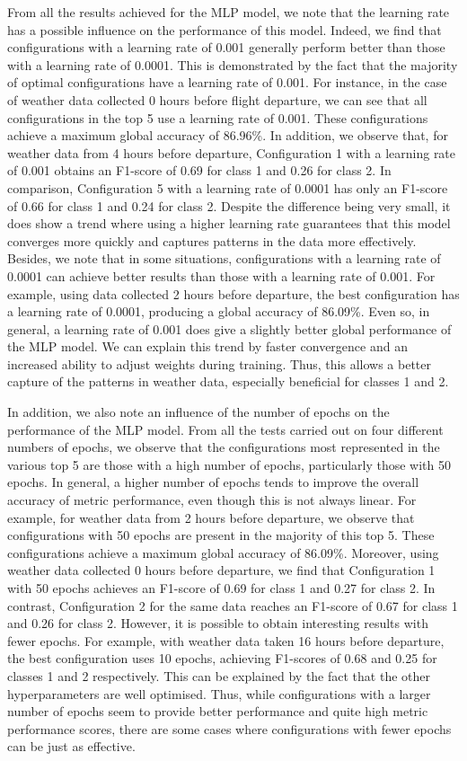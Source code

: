 \documentclass[12pt,oneside]{book} %
\begin{document}
\noindent From all the results achieved for the MLP model, we note that the learning rate has a possible influence on the performance of this model. Indeed, we find that configurations with a learning rate of 0.001 generally perform better than those with a learning rate of 0.0001. This is demonstrated by the fact that the majority of optimal configurations have a learning rate of 0.001. For instance, in the case of weather data collected 0 hours before flight departure, we can see that all configurations in the top 5 use a learning rate of 0.001. These configurations achieve a maximum global accuracy of 86.96\%. In addition, we observe that, for weather data from 4 hours before departure, Configuration 1 with a learning rate of 0.001 obtains an F1-score of 0.69 for class 1 and 0.26 for class 2. In comparison, Configuration 5 with a learning rate of 0.0001 has only an F1-score of 0.66 for class 1 and 0.24 for class 2. Despite the difference being very small, it does show a trend where using a higher learning rate guarantees that this model converges more quickly and captures patterns in the data more effectively. Besides, we note that in some situations, configurations with a learning rate of 0.0001 can achieve better results than those with a learning rate of 0.001. For example, using data collected 2 hours before departure, the best configuration has a learning rate of 0.0001, producing a global accuracy of 86.09\%. Even so, in general, a learning rate of 0.001 does give a slightly better global performance of the MLP model. We can explain this trend by faster convergence and an increased ability to adjust weights during training. Thus, this allows a better capture of the patterns in weather data, especially beneficial for classes 1 and 2.

\noindent In addition, we also note an influence of the number of epochs on the performance of the MLP model. From all the tests carried out on four different numbers of epochs, we observe that the configurations most represented in the various top 5 are those with a high number of epochs, particularly those with 50 epochs. In general, a higher number of epochs tends to improve the overall accuracy of metric performance, even though this is not always linear. For example, for weather data from 2 hours before departure, we observe that configurations with 50 epochs are present in the majority of this top 5. These configurations achieve a maximum global accuracy of 86.09\%. Moreover, using weather data collected 0 hours before departure, we find that Configuration 1 with 50 epochs achieves an F1-score of 0.69 for class 1 and 0.27 for class 2. In contrast, Configuration 2 for the same data reaches an F1-score of 0.67 for class 1 and 0.26 for class 2. However, it is possible to obtain interesting results with fewer epochs. For example, with weather data taken 16 hours before departure, the best configuration uses 10 epochs, achieving F1-scores of 0.68 and 0.25 for classes 1 and 2 respectively. This can be explained by the fact that the other hyperparameters are well optimised. Thus, while configurations with a larger number of epochs seem to provide better performance and quite high metric performance scores, there are some cases where configurations with fewer epochs can be just as effective.
\end{document}
